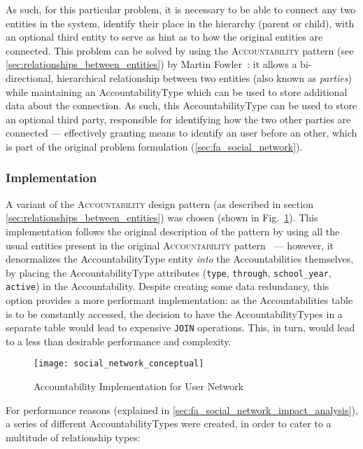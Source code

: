 As such, for this particular problem, it is necessary to be able to connect any two entities in the system, identify their place in the hierarchy (parent or child), with an optional third entity to serve as hint as to how the original entities are connected. This problem can be solved by using the \textsc{Accountability} pattern (see \ref{sec:relationships_between_entities}) by Martin Fowler~\cite{fowler_accountability}: it allows a bi-directional, hierarchical relationship between two entities (also known as \emph{parties}) while maintaining an AccountabilityType which can be used to store additional data about the connection. As such, this AccountabilityType can be used to store an optional third party, responsible for identifying how the two other parties are connected --- effectively granting means to identify an user before an other, which is part of the original problem formulation (\ref{sec:fa_social_network}).

\subsubsection{Implementation}\label{sec:fa_social_network_implementation}

A variant of the \textsc{Accountability} design pattern (as described in section \ref{sec:relationships_between_entities}) was chosen (shown in Fig.~\ref{fig:social_network_conceptual}). This implementation follows the original description of the pattern by using all the usual entities present in the original \textsc{Accountability} pattern~\cite{fowler_accountability} --- however, it denormalizes the AccountabilityType entity \emph{into} the Accountabilities themselves, by placing the AccountabilityType attributes (\verb!type!, \verb!through!, \verb!school_year!, \verb!active!) in the Accountability. Despite creating some data redundancy, this option provides a more performant implementation: as the Accountabilities table is to be constantly accessed, the decision to have the AccountabilityTypes in a separate table would lead to expensive \verb!JOIN! operations. This, in turn, would lead to a less than desirable performance and complexity.

\begin{figure}[H]
  \centering
  \texttt{[image: social\_network\_conceptual]}
  \caption{Accountability Implementation for User Network}
  \label{fig:social_network_conceptual}
\end{figure}

For performance reasons (explained in \ref{sec:fa_social_network_impact_analysis}), a series of different AccountabilityTypes were created, in order to cater to a multitude of relationship types:

